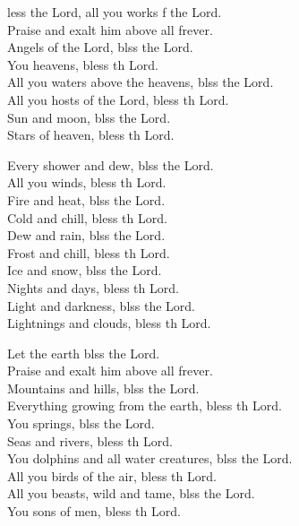 \settowidth{\versewidth}{Let us bless the Father, and the Son, and the Holy Spirit. *}
\begin{psalmverse}%
  \begin{patverse}
    less the Lord, all you works f the Lord.\Med\\
Praise and exalt him above all frever.\\
Angels of the Lord, blss the Lord.\Med\\
You heavens, bless th Lord.\\
All you waters above the heavens, blss the Lord.\Med\\
All you hosts of the Lord, bless th Lord.\\
Sun and moon, blss the Lord.\Med\\
Stars of heaven, bless th Lord.

Every shower and dew, blss the Lord.\Med\\
All you winds, bless th Lord.\\
Fire and heat, blss the Lord.\Med\\
Cold and chill, bless th Lord.\\
Dew and rain, blss the Lord.\Med\\
Frost and chill, bless th Lord.\\
Ice and snow, blss the Lord.\Med\\
Nights and days, bless th Lord.\\
Light and darkness, blss the Lord.\Med\\
Lightnings and clouds, bless th Lord.

Let the earth blss the Lord.\Med\\
Praise and exalt him above all frever.\\
Mountains and hills, blss the Lord.\Med\\
Everything growing from the earth, bless th Lord.\\
You springs, blss the Lord.\Med\\
Seas and rivers, bless th Lord.\\
You dolphins and all water creatures, blss the Lord.\Med\\
All you birds of the air, bless th Lord.\\
All you beasts, wild and tame, blss the Lord.\Med\\
You sons of men, bless th Lord.


\end{patverse}
\end{psalmverse}
